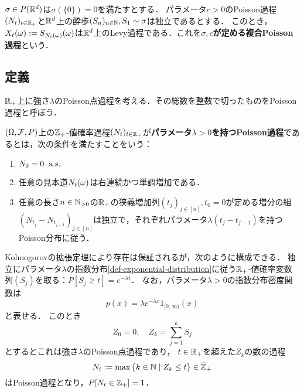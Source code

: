 \documentclass[uplatex,dvipdfmx]{jsreport}
\begin{document}
\begin{theorem}
    $\sigma\in P(\mathbb{R}^d)$は$\sigma(\{0\})=0$を満たすとする．
    パラメータ$c>0$のPoisson過程$(N_t)_{t\in\mathbb{R}_+}$と$\mathbb{R}^d$上の酔歩$(S_n)_{n\in\mathbb{N}},S_1\sim\sigma$は独立であるとする．
    このとき，$X_t(\omega):=S_{N_t(\omega)}(\omega)$は$\mathbb{R}^d$上のLevy過程である．これを\textbf{$\sigma,c$が定める複合Poisson過程}という．
\end{theorem}

\subsection{定義}

\begin{tcolorbox}[colframe=ForestGreen, colback=ForestGreen!10!white,breakable,colbacktitle=ForestGreen!40!white,coltitle=black,fonttitle=\bfseries\sffamily,
title=]
    $\mathbb{R}_+$上に強さ$\lambda$のPoisson点過程を考える．その総数を整数で切ったものをPoisson過程と呼ぼう．
\end{tcolorbox}

\begin{definition}
    $(\Omega,\mathcal{F},P)$上の$\mathbb{Z}_+$-値確率過程$(N_t)_{t\in\mathbb{R}_+}$が\textbf{パラメータ$\lambda>0$を持つPoisson過程}であるとは，次の条件を満たすことをいう：
    \begin{enumerate}
        \item $N_0=0\;\;\mathrm{a.s.}$
        \item 任意の見本道$N_t(\omega)$は右連続かつ単調増加である．
        \item 任意の長さ$n\in\mathbb{N}_{>0}$の$\mathbb{R}_+$の狭義増加列$(t_j)_{j\in[n]},t_0=0$が定める増分の組$(N_{t_j}-N_{t_{j-1}})_{j\in[n]}$は独立で，それぞれパラメータ$\lambda(t_j-t_{j-1})$を持つPoisson分布に従う．
    \end{enumerate}
\end{definition}

\begin{discussion}[Poisson過程の構成]
    Kolmogorovの拡張定理により存在は保証されるが，次のように構成できる．
    独立にパラメータ$\lambda$の指数分布\ref{def-exponential-distribution}に従う$\mathbb{R}_+$-値確率変数列$(S_j)$を取る：$P[S_j\ge t]=e^{-\lambda t}$．
    なお，パラメータ$\lambda>0$の指数分布密度関数は
    \[p(x)=\lambda e^{-\lambda x}1_{[0,\infty)}(x)\]
    と表せる．
    このとき
    \[Z_0=0,\quad Z_k=\sum^k_{j=1}S_j\]
    とするとこれは強さ$\lambda$のPoisson点過程であり，
    $t\in\mathbb{R}_+$を超えた$Z_k$の数の過程
    \[N_t:=\max\left\{k\in\mathbb{N}\mid Z_k\le t\right\}\in\overline{\mathbb{Z}}_+\]
    はPoisson過程となり，$P[N_t\in\mathbb{Z}_+]=1$．
\end{discussion}
\end{document}
